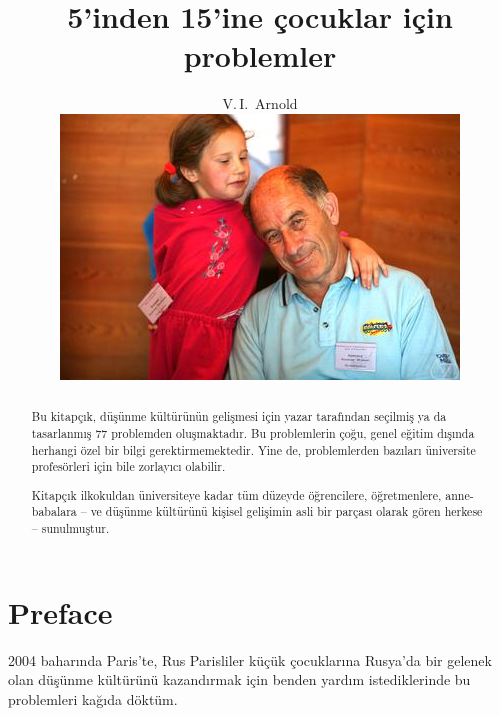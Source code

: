 
\setdefaultlanguage{turkish}

\title{5'inden 15'ine çocuklar için problemler}

\author{V.\,I.~Arnold
\vspace*{2cm}\\
\includegraphics[width=\linewidth]{resources/photo-arnold_small}
}
\date{}

\newcommand\ba{\begin{array}}
\newcommand\ea{\end{array}}
\newcommand{\ra}{\rightarrow}


\maketitle
\thispagestyle{empty}
\cleardoublepage
\setcounter{page}{1}
\begin{abstract}

Bu kitapçık, düşünme kültürünün gelişmesi için yazar ta\-ra\-fın\-dan seçilmiş ya da tasarlanmış 77 problemden oluşmaktadır. Bu prob\-lem\-lerin çoğu, genel eğitim dışında herhangi özel bir bilgi gerektirmemektedir. Yine de, problemlerden bazıları üniversite profesörleri için bile zorlayıcı olabilir.

Kitapçık ilkokuldan  üniversiteye kadar tüm düzeyde  öğren\-ci\-le\-re, öğretmenlere, anne-babalara -- ve düşünme kültürünü kişisel gelişimin  asli bir parçası olarak gören herkese -- sunulmuştur.
\end{abstract}
\clearpage

\section*{Preface}
2004 baharında Paris'te, Rus Parisliler küçük çocuklarına Rusya'da bir gelenek olan  düşünme kültürünü kazandırmak için benden yardım istediklerinde bu problemleri kağıda döktüm.

